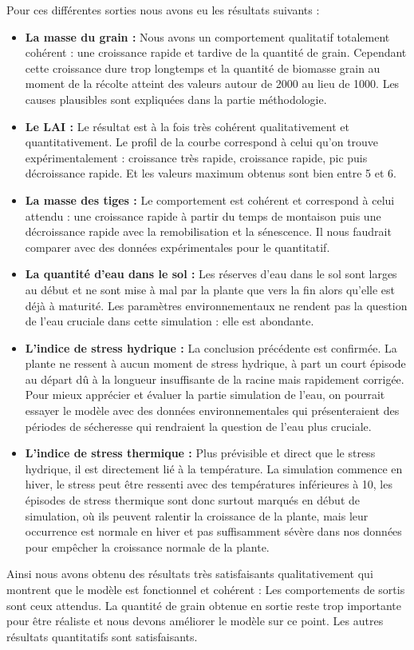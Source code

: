 Pour ces différentes sorties nous avons eu les résultats suivants :

\begin{itemize}
	\item \textbf{La masse du grain :} Nous avons un comportement qualitatif totalement cohérent : une croissance rapide et tardive de la quantité de grain. Cependant cette croissance dure trop longtemps et la quantité de biomasse grain au moment de la récolte atteint des valeurs autour de 2000 au lieu de 1000. Les causes plausibles sont expliquées dans la partie méthodologie.
	
	\item \textbf{Le LAI :} Le résultat est à la fois très cohérent qualitativement et quantitativement. Le profil de la courbe correspond à celui qu'on trouve expérimentalement : croissance très rapide, croissance rapide, pic puis décroissance rapide. Et les valeurs maximum obtenus sont bien entre 5 et 6.
	
	\item \textbf{La masse des tiges :} Le comportement est cohérent et correspond à celui attendu : une croissance rapide à partir du temps de montaison puis une décroissance rapide avec la remobilisation et la sénescence. Il nous faudrait comparer avec des données expérimentales pour le quantitatif.
	
	\item \textbf{La quantité d'eau dans le sol :} Les réserves d'eau dans le sol sont larges au début et ne sont mise à mal par la plante que vers la fin alors qu'elle est déjà à maturité. Les paramètres environnementaux ne rendent pas la question de l'eau cruciale dans cette simulation : elle est abondante.
	
	\item \textbf{L'indice de stress hydrique :} La conclusion précédente est confirmée. La plante ne ressent à aucun moment de stress hydrique, à part un court épisode au départ dû à la longueur insuffisante de la racine mais rapidement corrigée. Pour mieux apprécier et évaluer la partie simulation de l'eau, on pourrait essayer le modèle avec des données environnementales qui présenteraient des périodes de sécheresse qui rendraient la question de l'eau plus cruciale.
	
	\item \textbf{L'indice de stress thermique :} Plus prévisible et direct que le stress hydrique, il est directement lié à la température. La simulation commence en hiver, le stress peut être ressenti avec des températures inférieures à 10, les épisodes de stress thermique sont donc surtout marqués en début de simulation, où ils peuvent ralentir la croissance de la plante, mais leur occurrence est normale en hiver et pas suffisamment sévère dans nos données pour empêcher la croissance normale de la plante.
\end{itemize}

Ainsi nous avons obtenu des résultats très satisfaisants qualitativement qui montrent que le modèle est fonctionnel et cohérent : Les comportements de sortis sont ceux attendus. La quantité de grain obtenue en sortie reste trop importante pour être réaliste et nous devons améliorer le modèle sur ce point. Les autres résultats quantitatifs sont satisfaisants.